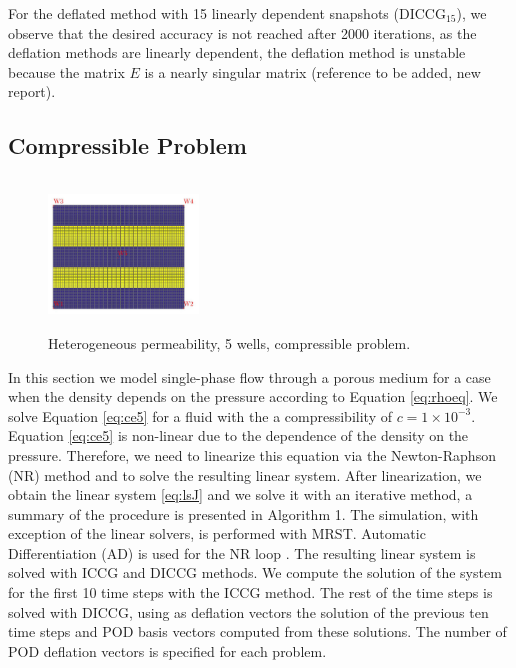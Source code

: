 \documentclass[review]{elsarticle}
\begin{document}
For the deflated method with 15 linearly dependent snapshots (DICCG$_{15}$), we observe that the desired accuracy is not reached after 2000 iterations, as the deflation methods are linearly dependent, the deflation method is unstable because the matrix $E$ is a nearly singular matrix (reference to be added, new report).
\subsection{Compressible Problem}

\begin{figure}
\centering 
\vspace{-20pt}
\includegraphics[width=4cm,height=4cm,keepaspectratio]{images/perm70.jpg}
 \vspace{-15pt}
\caption{ Heterogeneous permeability, 5 wells, compressible problem.}\label{fig:pc}
\vspace{-10pt}
\end{figure} 
In this section we model single-phase flow through a porous medium for a case when the density depends on the pressure 
according to Equation \eqref{eq:rhoeq}. We solve Equation \eqref{eq:ce5} for a fluid with the a compressibility of $c= 1 \times 10^{-3}$.
Equation \eqref{eq:ce5} is non-linear due to the dependence of the density on the pressure. Therefore, we need to 
linearize this equation via the Newton-Raphson (NR) method and to solve the resulting linear system. After linearization, we obtain the linear system \eqref{eq:lsJ} and we solve it with an iterative method, a summary of the procedure is presented in Algorithm 1. The simulation, with exception of the linear solvers, is performed with MRST. Automatic Differentiation (AD) is used for the NR loop \cite{Lie13}. The resulting linear system is solved with ICCG and DICCG methods. We compute the solution of the system for the first 10 time steps with the ICCG method. The rest of the time steps is solved with DICCG, using as deflation vectors the solution of the previous ten time steps and POD basis vectors computed from these solutions. The number of POD deflation vectors is specified for each problem. \\
\end{document}
